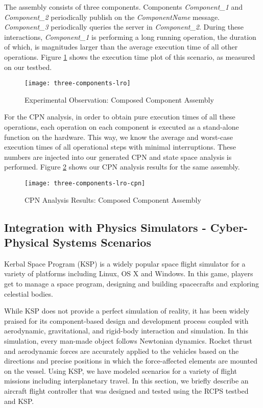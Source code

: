 The assembly consists of three components. Components \emph{Component\_1} and \emph{Component\_2} periodically publish on the \emph{ComponentName} message. \emph{Component\_3} periodically queries the server in \emph{Component\_2}. During these interactions, \emph{Component\_1} is performing a long running operation, the duration of which, is magnitudes larger than the average execution time of all other operations. Figure \ref{fig:three-components-lro} shows the execution time plot of this scenario, as measured on our testbed. 

\begin{figure}[h]
	\centering
	\texttt{[image: three-components-lro]}
	\caption{Experimental Observation: Composed Component Assembly}
	\label{fig:three-components-lro}
\end{figure}
\FloatBarrier

For the CPN analysis, in order to obtain pure execution times of all these operations, each operation on each component is executed as a stand-alone function on the hardware. This way, we know the average and worst-case execution times of all operational steps with minimal interruptions. These numbers are injected into our generated CPN and state space analysis is performed. Figure \ref{fig:three-components-lro-cpn} shows our CPN analysis results for the same assembly.


\begin{figure}[h]
	\centering
	\texttt{[image: three-components-lro-cpn]}
	\caption{CPN Analysis Results: Composed Component Assembly}
	\label{fig:three-components-lro-cpn}
\end{figure}
\FloatBarrier

\subsection{Integration with Physics Simulators - Cyber-Physical Systems Scenarios}

Kerbal Space Program \cite{KSP} (KSP) is a widely popular space flight simulator for a variety of platforms including Linux, OS X and Windows. In this game, players get to manage a space program, designing and building spacecrafts and exploring celestial bodies. 

While KSP does not provide a perfect simulation of reality, it has been widely praised for its component-based design and development process coupled with aerodynamic, gravitational, and rigid-body interaction and simulation. In this simulation, every man-made object follows Newtonian dynamics. Rocket thrust and aerodynamic forces are accurately applied to the vehicles based on the directions and precise positions in which the force-affected elements are mounted on the vessel. Using KSP, we have modeled scenarios for a variety of flight missions including interplanetary travel. In this section, we briefly describe an aircraft flight controller that was designed and tested using the RCPS testbed and KSP.

